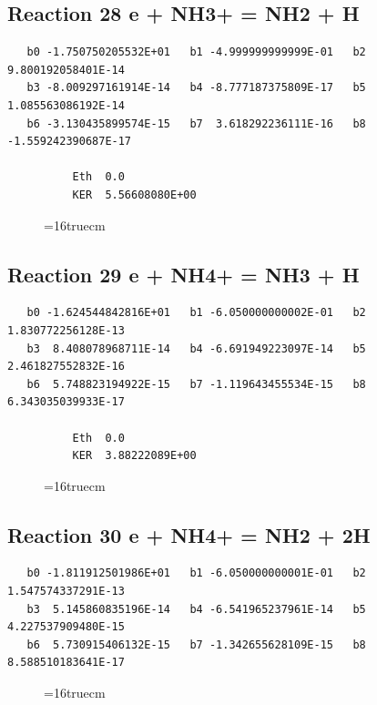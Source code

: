 \documentclass[12pt,dvipdfm]{article}
\begin{document}
\subsection{
Reaction 28 e + NH3+ = NH2 + H }
\begin{small}\begin{verbatim}
   b0 -1.750750205532E+01   b1 -4.999999999999E-01   b2  9.800192058401E-14
   b3 -8.009297161914E-14   b4 -8.777187375809E-17   b5  1.085563086192E-14
   b6 -3.130435899574E-15   b7  3.618292236111E-16   b8 -1.559242390687E-17

          Eth  0.0
          KER  5.56608080E+00

\end{verbatim}\end{small}
\begin{figure}[h!] \label{n2rates}
\epsfxsize=16truecm
\end{figure}
\newpage

\subsection{
Reaction 29 e + NH4+ = NH3 + H }
\begin{small}\begin{verbatim}
   b0 -1.624544842816E+01   b1 -6.050000000002E-01   b2  1.830772256128E-13
   b3  8.408078968711E-14   b4 -6.691949223097E-14   b5  2.461827552832E-16
   b6  5.748823194922E-15   b7 -1.119643455534E-15   b8  6.343035039933E-17

          Eth  0.0
          KER  3.88222089E+00

\end{verbatim}\end{small}
\begin{figure}[h!] \label{n2rates}
\epsfxsize=16truecm
\end{figure}
\newpage

\subsection{
Reaction 30 e + NH4+ = NH2 + 2H }
\begin{small}\begin{verbatim}
   b0 -1.811912501986E+01   b1 -6.050000000001E-01   b2  1.547574337291E-13
   b3  5.145860835196E-14   b4 -6.541965237961E-14   b5  4.227537909480E-15
   b6  5.730915406132E-15   b7 -1.342655628109E-15   b8  8.588510183641E-17
\end{verbatim}\end{small}
\begin{figure}[h!] \label{n2rates}
\epsfxsize=16truecm
\end{figure}
\newpage
\end{document}
